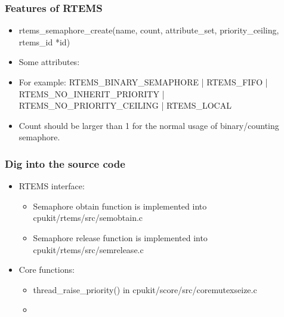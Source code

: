 \documentclass[t]{beamer}
\begin{document}
\begin{frame}
\frametitle{Features of RTEMS}
\begin{itemize}
\item rtems\_semaphore\_create(name, count, attribute\_set, priority\_ceiling, rtems\_id *id)
\item Some attributes:
\item For example:{ \scriptsize{RTEMS\_BINARY\_SEMAPHORE | RTEMS\_FIFO | RTEMS\_NO\_INHERIT\_PRIORITY | RTEMS\_NO\_PRIORITY\_CEILING | RTEMS\_LOCAL}}
\item Count should be larger than 1 for the normal usage of binary/counting semaphore. 
\end{itemize}
\end{frame}

\begin{frame}
\frametitle{Dig into the source code}
\begin{itemize}
\item RTEMS interface:
\begin{itemize}
\item Semaphore obtain function is implemented into cpukit/rtems/src/semobtain.c
\item Semaphore release function is implemented into cpukit/rtems/src/semrelease.c
\end{itemize}
\item Core functions:
\begin{itemize}
\item thread\_raise\_priority() in cpukit/score/src/coremutexseize.c
\item 
\end{itemize}

\end{itemize}
\end{frame}
\end{document}
